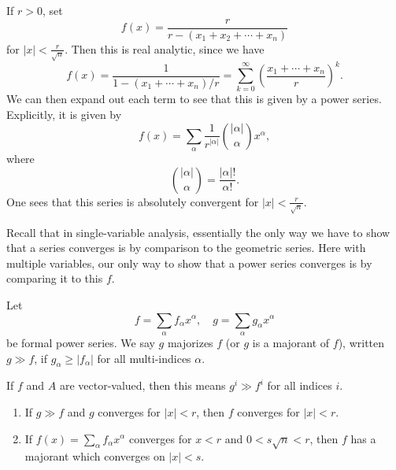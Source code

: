 \documentclass[a4paper]{article}
\begin{document}
\begin{eg}
  If $r > 0$, set
  \[
    f(x) = \frac{r}{r - (x_1 + x_2 + \cdots + x_n)}
  \]
  for $|x| < \frac{r}{\sqrt{n}}$. Then this is real analytic, since we have
  \[
    f(x) = \frac{1}{1 - (x_1 + \cdots + x_n)/r} = \sum_{k = 0}^\infty \left(\frac{x_1 + \cdots + x_n}{r}\right)^k.
  \]
  We can then expand out each term to see that this is given by a power series. Explicitly, it is given by
  \[
    f(x) = \sum_\alpha \frac{1}{r^{|\alpha|}}\binom{|\alpha|}{\alpha} x^\alpha,
  \]
  where
  \[
    \binom{|\alpha|}{\alpha} = \frac{|\alpha|!}{\alpha!}.
  \]
  One sees that this series is absolutely convergent for $|x| < \frac{r}{\sqrt{n}}$.
\end{eg}
Recall that in single-variable analysis, essentially the only way we have to show that a series converges is by comparison to the geometric series. Here with multiple variables, our only way to show that a power series converges is by comparing it to this $f$.

\begin{defi}[Majorant]
  Let
  \[
    f = \sum_\alpha f_\alpha x^\alpha,\quad g = \sum_\alpha g_\alpha x^\alpha
  \]
  be formal power series. We say $g$ majorizes $f$ (or $g$ is a majorant of $f$), written $g \gg f$, if $g_\alpha \geq |f_\alpha|$ for all multi-indices $\alpha$.

  If $f$ and $A$ are vector-valued, then this means $g^i \gg f^i$ for all indices $i$.
\end{defi}

\begin{lemma}\leavevmode
  \begin{enumerate}
    \item If $g \gg f$ and $g$ converges for $|x| < r$, then $f$ converges for $|x| < r$.
    \item If $f(x) = \sum_\alpha f_\alpha x^\alpha$ converges for $x < r$ and $0 < s\sqrt{n} < r$, then $f$ has a majorant which converges on $|x| < s$. %
  \end{enumerate}
\end{lemma}
\end{document}
